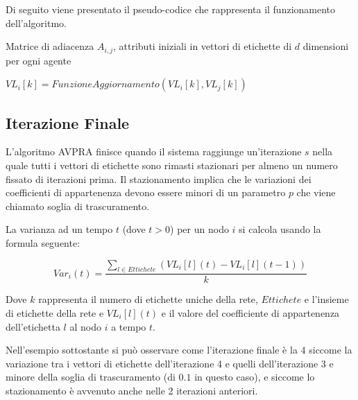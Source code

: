 \documentclass[a4paper,12pt]{report}
\begin{document}
		Di seguito viene presentato il pseudo-codice che rappresenta il funzionamento dell'algoritmo. \cite{avpra}
 
		\begin{algorithmic}
			\REQUIRE Matrice di adiacenza $A_{i, j}$, attributi iniziali in vettori di etichette di $d$ dimensioni per ogni agente


				\STATE {}

					
					\STATE {}


						\STATE {}

							\STATE $VL_i[k] = FunzioneAggiornamento(VL_i[k], VL_j[k])$

						\ENDIF
					\ENDFOR
				\ENDFOR	
			\ENDFOR
		\end{algorithmic}

		\subsection{Iterazione Finale}
		L'algoritmo AVPRA finisce quando il sistema raggiunge un'iterazione $s$ nella quale tutti i vettori di etichette sono rimasti stazionari per almeno un numero fissato di iterazioni prima. Il stazionamento implica che le variazioni dei coefficienti di appartenenza devono essere minori di un parametro $p$ che viene chiamato soglia di trascuramento.  \cite{avpra}

		La varianza ad un tempo $t$ (dove $t > 0$) per un nodo $i$ si calcola usando la formula seguente:
		
		\begin{equation}
			Var_i(t) = \frac{\sum_{l \in Ettichete} (VL_i[l](t) - VL_i[l](t-1))}{k}
		\end{equation}

		Dove $k$ rappresenta il numero di etichette uniche della rete, $Ettichete$ e l'insieme di etichette della rete e $VL_i[l](t)$ e il valore del coefficiente di appartenenza dell'etichetta $l$ al nodo $i$ a tempo $t$.

		Nell'esempio sottostante si può osservare come l'iterazione finale è la 4 siccome la variazione tra i vettori di etichette dell'iterazione 4 e quelli dell'iterazione 3 e minore della soglia di trascuramento (di $0.1$ in questo caso), e siccome lo stazionamento è avvenuto anche nelle 2 iterazioni anteriori.
		
\end{document}
